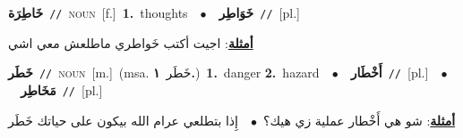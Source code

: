\documentclass[10pt,a4paper,twoside]{article} %
\begin{document}
\begin{multicols}{2}
{\setlength\topsep{0pt}\textbf{\foreignlanguage{arabic}{خَاطِرَة}}\ {\color{gray}\texttt{//}\color{black}}\ \textsc{noun}\ [f.]\ \textbf{1.}~thoughts\ \ $\bullet$\ \ \setlength\topsep{0pt}\textbf{\foreignlanguage{arabic}{خَوَاطِر}}\ {\color{gray}\texttt{//}\color{black}}\ [pl.]\  \begin{flushright}\color{gray}\foreignlanguage{arabic}{\textbf{\underline{\foreignlanguage{arabic}{أمثلة}}}: اجيت أكتب خَواطري ماطلعش معي اشي}\end{flushright}\color{black}} \vspace{2mm}

{\setlength\topsep{0pt}\textbf{\foreignlanguage{arabic}{خَطَر}}\ {\color{gray}\texttt{//}\color{black}}\ \textsc{noun}\ [m.]\ \color{gray}(msa. \foreignlanguage{arabic}{خَطَر}~\foreignlanguage{arabic}{\textbf{١.}})\color{black}\ \textbf{1.}~danger  \textbf{2.}~hazard\ \ $\bullet$\ \ \setlength\topsep{0pt}\textbf{\foreignlanguage{arabic}{أَخْطَار}}\ {\color{gray}\texttt{//}\color{black}}\ [pl.]\ \ $\bullet$\ \ \setlength\topsep{0pt}\textbf{\foreignlanguage{arabic}{مَخَاطِر}}\ {\color{gray}\texttt{//}\color{black}}\ [pl.]\  \begin{flushright}\color{gray}\foreignlanguage{arabic}{\textbf{\underline{\foreignlanguage{arabic}{أمثلة}}}: شو هي أَخْطار عملية زي هيك؟\ $\bullet$\ \  إِذا بتطلعي عرام الله بيكون على حياتك خَطَر}\end{flushright}\color{black}} \vspace{2mm}


\end{multicols}
\end{document}
